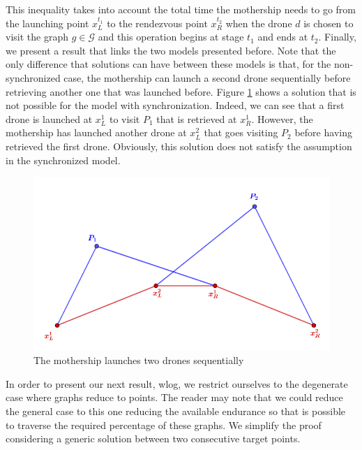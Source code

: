 \noindent
This inequality takes into account the total time the mothership needs to go from the launching point $x_L^{t_1}$ to the rendezvous point $x_R^{t_2}$ when  the drone $d$ is chosen to visit the graph $g\in\mathcal G$ and this operation begins at stage $t_1$ and ends at $t_2$.
\noindent
Finally, we present a result that links the two models presented before. Note that the only difference that solutions can have between these models is that, for the non-synchronized case, the mothership can launch a second drone sequentially before retrieving another one that was launched before. Figure \ref{fig:proof1} shows a solution that is not possible for the model with synchronization. Indeed, we can see that a first drone is launched at $x_L^1$ to visit $P_1$ that is retrieved at $x_R^1$. However, the mothership has launched another drone at $x_L^2$ that goes visiting $P_2$ before having retrieved the first drone. Obviously, this solution does not satisfy the assumption in the synchronized model. 


\begin{figure}[h!]
    \centering
    \includegraphics[width = 0.7\linewidth]{proof1.PNG}
    \caption{The mothership launches two drones sequentially}
    \label{fig:proof1}
\end{figure}

\noindent
In order to present our next result, wlog,  we restrict ourselves to the degenerate case where graphs reduce to points. The reader may note that we could reduce the general case to this one reducing the available endurance so that is possible to traverse the required percentage of these graphs. We simplify the proof considering a generic solution between two consecutive target points.


